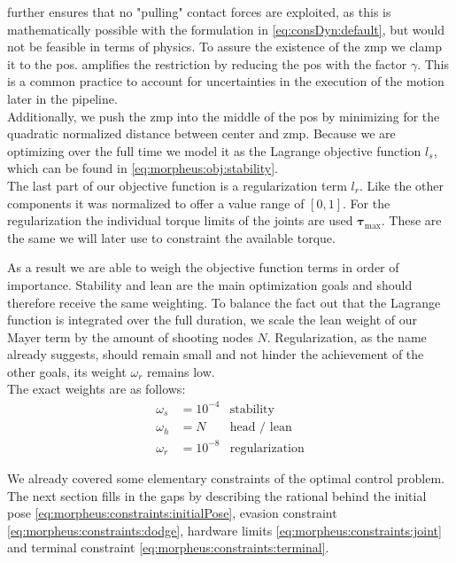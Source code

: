  further ensures that no "pulling" contact forces are exploited, as this is mathematically possible with the formulation in \cref{eq:consDyn:default}, but would not be feasible in terms of physics.
To assure the existence of the \acrshort{zmp} we clamp it to the \acrshort{pos}.
 amplifies the restriction by reducing the \acrshort{pos} with the factor $\gamma$.
This is a common practice to account for uncertainties in the execution of the motion later in the pipeline.
\\
Additionally, we push the \acrshort{zmp} into the middle of the \acrshort{pos} by minimizing for the quadratic normalized distance between center and \acrshort{zmp}.
Because we are optimizing over the full time we model it as the Lagrange objective function $l_s$, which can be found in \cref{eq:morpheus:obj:stability}.
\\
The last part of our objective function is a regularization term $l_r$.
Like the other components it was normalized to offer a value range of $\left[0,1\right]$.
For the regularization the individual torque limits of the joints are used $\bm \tau_\text{max}$.
These are the same we will later use to constraint the available torque.
\par
As a result we are able to weigh the objective function terms in order of importance.
Stability and lean are the main optimization goals and should therefore receive the same weighting.
To balance the fact out that the Lagrange function is integrated over the full duration, we scale the lean weight of our Mayer term by the amount of shooting nodes $N$.
Regularization, as the name already suggests, should remain small and not hinder the achievement of the other goals, its weight $\omega_r$ remains low.
\\
The exact weights are as follows:
\begin{subequations}
  \begin{align}
    \omega_s &= 10^{-4} & \text{stability} \nonumber \\
    \omega_h &= N & \text{head / lean} \nonumber \\
    \omega_r &= 10^{-8} & \text{regularization} \nonumber
  \end{align}
  \label{eq:morpheus:weights}
\end{subequations}
\par
We already covered some elementary constraints of the optimal control problem.
The next section fills in the gaps by describing the rational behind the initial pose \cref{eq:morpheus:constraints:initialPose}, evasion constraint \cref{eq:morpheus:constraints:dodge}, hardware limits \cref{eq:morpheus:constraints:joint} and terminal constraint \cref{eq:morpheus:constraints:terminal}.

